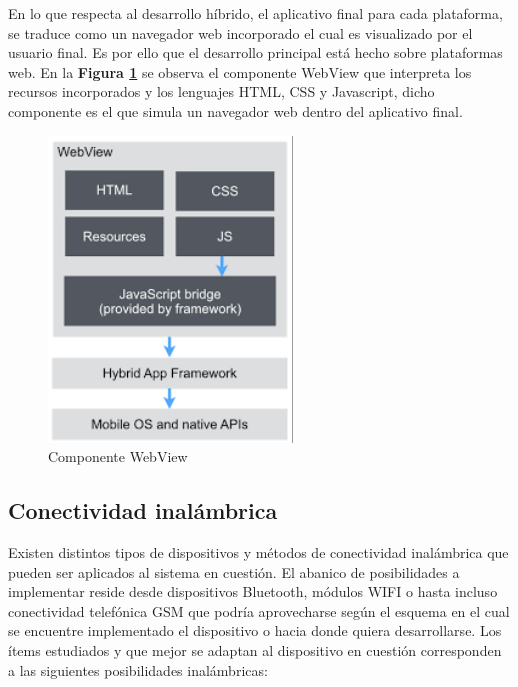 \documentclass{IEEEtran}
\begin{document}
			En lo que respecta al desarrollo híbrido, el aplicativo final para cada plataforma, se traduce como un navegador web incorporado el cual es visualizado por el usuario final. Es por ello que el desarrollo principal está hecho sobre plataformas web. En la \textbf{Figura \ref{ionic-angular-cordova-webview}} se observa el componente WebView que interpreta los recursos incorporados y los lenguajes HTML, CSS y Javascript, dicho componente es el que simula un navegador web dentro del aplicativo final. \newpage

			\begin{figure}[h]
				\centering
				\includegraphics[width=0.6\linewidth]{ionic-angular-cordova-webview.png}
				\caption{Componente WebView}
				\label{ionic-angular-cordova-webview}
			\end{figure}
			

		\subsection{Conectividad inalámbrica}

			Existen distintos tipos de dispositivos y métodos de conectividad inalámbrica que pueden ser aplicados al sistema en cuestión. El abanico de posibilidades a implementar reside desde dispositivos Bluetooth, módulos WIFI o hasta incluso conectividad telefónica GSM que podría aprovecharse según el esquema en el cual se encuentre implementado el dispositivo o hacia donde quiera desarrollarse. Los ítems estudiados y que mejor se adaptan al dispositivo en cuestión corresponden a las siguientes posibilidades inalámbricas:\\
\end{document}
